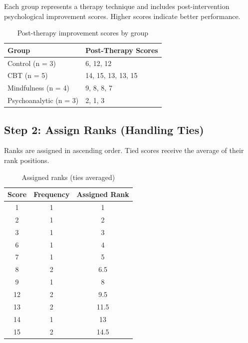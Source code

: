 \documentclass[a4paper,fleqn,review]{cas-sc}
\begin{document}
Each group represents a therapy technique and includes post-intervention psychological improvement scores. Higher scores indicate better performance.

\begin{table}[!hbtp]
	\centering
	\renewcommand{\arraystretch}{1.3}
	\begin{tabular}{|l|l|}
		\hline
		\textbf{Group} & \textbf{Post-Therapy Scores} \\
		\hline
		Control (n = 3) & 6, 12, 12 \\
		CBT (n = 5) & 14, 15, 13, 13, 15 \\
		Mindfulness (n = 4) & 9, 8, 8, 7 \\
		Psychoanalytic (n = 3) & 2, 1, 3 \\
		\hline
	\end{tabular}
	\caption{Post-therapy improvement scores by group}
\end{table}

\vspace{1em}

\subsection*{Step 2: Assign Ranks (Handling Ties)}

Ranks are assigned in ascending order. Tied scores receive the average of their rank positions.

\begin{table}[!hbtp]
	\centering
	\renewcommand{\arraystretch}{1.3}
	\begin{tabular}{|c|c|c|}
		\hline
		\textbf{Score} & \textbf{Frequency} & \textbf{Assigned Rank} \\
		\hline
		1 & 1 & 1 \\
		2 & 1 & 2 \\
		3 & 1 & 3 \\
		6 & 1 & 4 \\
		7 & 1 & 5 \\
		8 & 2 & 6.5 \\
		9 & 1 & 8 \\
		12 & 2 & 9.5 \\
		13 & 2 & 11.5 \\
		14 & 1 & 13 \\
		15 & 2 & 14.5 \\
		\hline
	\end{tabular}
	\caption{Assigned ranks (ties averaged)}
\end{table}

\vspace{1em}
\end{document}
